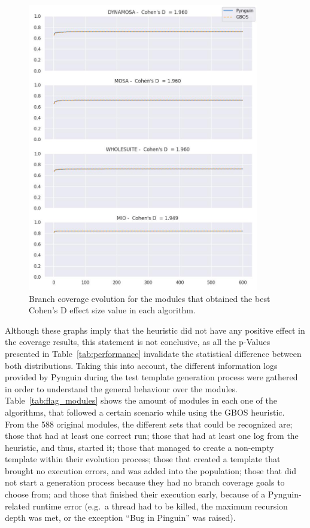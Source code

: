 \documentclass[%
  chapterprefix=false,%
  open=right,%
  twoside=true,%
  paper=a4,%
  logofile={Figures/logo.png},%
  thesistype=master,%
  UKenglish,%
]{se2thesis}
\begin{document}
\begin{figure}[ptbh]
  \centering
  \includegraphics[width=0.9\textwidth]{Figures/Results/bestES.jpg}
  \caption{Branch coverage evolution for the modules that obtained the best Cohen's D effect size value in each algorithm.}\label{fig:best}
\end{figure}

Although these graphs imply that the heuristic did not have any positive effect in the coverage results, this statement is not conclusive, as all the p-Values presented in Table~\ref{tab:performance} invalidate the statistical difference between both distributions.
Taking this into account, the different information logs provided by Pynguin during the test template generation process were gathered in order to understand the general behaviour over the modules.
Table~\ref{tab:flag_modules} shows the amount of modules in each one of the algorithms, that followed a certain scenario while using the GBOS heuristic.
From the 588 original modules, the different sets that could be recognized are; those that had at least one correct run; those that had at least one log from the heuristic, and thus, started it; those that managed to create a non-empty template within their evolution process; those that created a template that brought no execution errors, and was added into the population; those that did not start a generation process because they had no branch coverage goals to choose from; and those that finished their execution early, because of a Pynguin-related runtime error (e.g.~a thread had to be killed, the maximum recursion depth was met, or the exception ``Bug in Pinguin'' was raised). 
\end{document}
